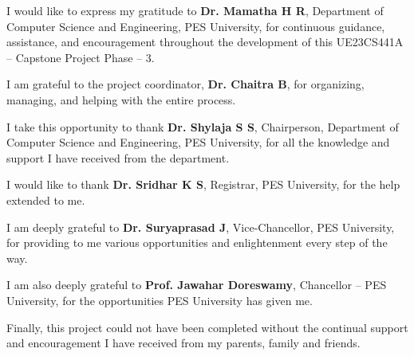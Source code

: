\thispagestyle{empty}
\vspace*{12mm}
\vspace{4mm}
\begingroup
\justifying
I would like to express my gratitude to \textbf{Dr. Mamatha H R}, Department of Computer Science and
Engineering, PES University, for continuous guidance, assistance, and encouragement throughout
the development of this UE23CS441A -- Capstone Project Phase -- 3.

I am grateful to the project coordinator, \textbf{Dr. Chaitra B}, for organizing, managing, and
helping with the entire process.

I take this opportunity to thank \textbf{Dr. Shylaja S S}, Chairperson, Department of Computer
Science and Engineering, PES University, for all the knowledge and support I have received from the
department.

I would like to thank \textbf{Dr. Sridhar K S}, Registrar, PES University, for the help extended to me.

I am deeply grateful to \textbf{Dr. Suryaprasad J}, Vice-Chancellor, PES University, for providing to
me various opportunities and enlightenment every step of the way.


I am also deeply grateful to \textbf{Prof. Jawahar Doreswamy}, Chancellor -- PES University, for the
opportunities PES University has given me.

Finally, this project could not have been completed without the continual support and encouragement
I have received from my parents, family and friends.\par
\endgroup
\clearpage
